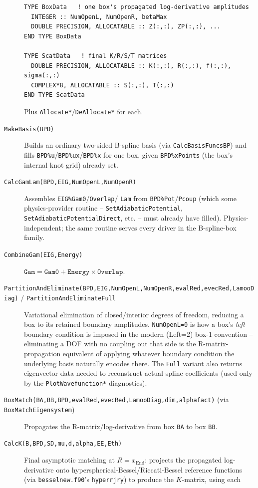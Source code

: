 \documentclass[11pt]{article}
\newcommand{\file}[1]{\texttt{#1}}
\newcommand{\sub}[1]{\texttt{#1}}
\begin{document}
\begin{description}
\begin{lstlisting}
TYPE BoxData   ! one box's propagated log-derivative amplitudes
  INTEGER :: NumOpenL, NumOpenR, betaMax
  DOUBLE PRECISION, ALLOCATABLE :: Z(:,:), ZP(:,:), ...
END TYPE BoxData

TYPE ScatData   ! final K/R/S/T matrices
  DOUBLE PRECISION, ALLOCATABLE :: K(:,:), R(:,:), f(:,:), sigma(:,:)
  COMPLEX*8, ALLOCATABLE :: S(:,:), T(:,:)
END TYPE ScatData
\end{lstlisting}
  Plus \sub{Allocate*}/\sub{DeAllocate*} for each.
\item[\sub{MakeBasis(BPD)}] Builds an ordinary two-sided B-spline basis (via
  \sub{CalcBasisFuncsBP}) and fills \texttt{BPD\%u}/\texttt{BPD\%ux}/\texttt{BPD\%x} for one box,
  given \texttt{BPD\%xPoints} (the box's internal knot grid) already set.
\item[\sub{CalcGamLam(BPD,EIG,NumOpenL,NumOpenR)}] Assembles \texttt{EIG\%Gam0}/\texttt{Overlap}/
  \texttt{Lam} from \texttt{BPD\%Pot}/\texttt{Pcoup} (which some physics-provider routine --
  \sub{SetAdiabaticPotential}, \sub{SetAdiabaticPotentialDirect}, etc. -- must already have
  filled). Physics-independent; the same routine serves every driver in the B-spline-box family.
\item[\sub{CombineGam(EIG,Energy)}] $\texttt{Gam}=\texttt{Gam0}+\texttt{Energy}\times
  \texttt{Overlap}$.
\item[\sub{PartitionAndEliminate(BPD,EIG,NumOpenL,NumOpenR,evalRed,evecRed,LamooDiag)} /
  \sub{PartitionAndEliminateFull}] Variational elimination of closed/interior degrees of freedom,
  reducing a box to its retained boundary amplitudes. \texttt{NumOpenL=0} is how a box's
  \emph{left} boundary condition is imposed in the modern (Left=2) box-1 convention -- eliminating
  a DOF with no coupling out that side is the R-matrix-propagation equivalent of applying whatever
  boundary condition the underlying basis naturally encodes there. The \texttt{Full} variant also
  returns eigenvector data needed to reconstruct actual spline coefficients (used only by the
  \file{PlotWavefunction*} diagnostics).
\item[\sub{BoxMatch(BA,BB,BPD,evalRed,evecRed,LamooDiag,dim,alphafact)} (via
  \sub{BoxMatchEigensystem})] Propagates the R-matrix/log-derivative from box \texttt{BA} to box
  \texttt{BB}.
\item[\sub{CalcK(B,BPD,SD,mu,d,alpha,EE,Eth)}] Final asymptotic matching at $R=x_{\text{End}}$:
  projects the propagated log-derivative onto hyperspherical-Bessel/Riccati-Bessel reference
  functions (via \file{besselnew.f90}'s \sub{hyperrjry}) to produce the $K$-matrix, using each

\end{description}
\end{document}
